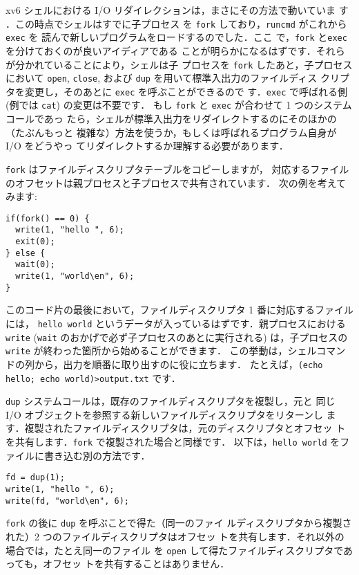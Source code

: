 xv6 シェルにおける I/O リダイレクションは，まさにその方法で動いていま
す ．この時点でシェルはすでに子プロセス
を \lstinline{fork} しており，\lstinline{runcmd} がこれから \lstinline{exec} を
読んで新しいプログラムをロードするのでした．ここ
で，\lstinline{fork} と\lstinline{exec} を分けておくのが良いアイディアである
ことが明らかになるはずです．それらが分かれていることにより，シェルは子
プロセスを \lstinline{fork} したあと，子プロセスにおいて \lstinline{open},
\lstinline{close}, および \lstinline{dup} を用いて標準入出力のファイルディス
クリプタを変更し，そのあとに \lstinline{exec} を呼ぶことができるので
す．\lstinline{exec} で呼ばれる側 (例では \lstinline{cat}) の変更は不要です．
もし \lstinline{fork} と \lstinline{exec} が合わせて 1 つのシステムコールであっ
たら，シェルが標準入出力をリダイレクトするのにそのほかの（たぶんもっと
複雑な）方法を使うか，もしくは呼ばれるプログラム自身が I/O をどうやっ
てリダイレクトするか理解する必要があります．


\lstinline{fork} はファイルディスクリプタテーブルをコピーしますが，
対応するファイルのオフセットは親プロセスと子プロセスで共有されています．
次の例を考えてみます:
\begin{lstlisting}[]
if(fork() == 0) {
  write(1, "hello ", 6);
  exit(0);
} else {
  wait(0);
  write(1, "world\en", 6);
}
\end{lstlisting}
このコード片の最後において，ファイルディスクリプタ 1 番に対応するファイルには，
\lstinline{hello world} というデータが入っているはずです．親プロセスにおける
\lstinline{write} (\lstinline{wait} のおかげで必ず子プロセスのあとに実行される)
は，子プロセスの \lstinline{write} が終わった箇所から始めることができます．
この挙動は，シェルコマンドの列から，出力を順番に取り出すのに役に立ちます．
たとえば，\lstinline{(echo hello; echo world)>output.txt} です．


\lstinline{dup} システムコールは，既存のファイルディスクリプタを複製し，元と
同じ I/O オブジェクトを参照する新しいファイルディスクリプタをリターンし
ます．複製されたファイルディスクリプタは，元のディスクリプタとオフセッ
トを共有します．\lstinline{fork} で複製された場合と同様です．
以下は，\lstinline{hello world} をファイルに書き込む別の方法です．
\begin{lstlisting}[]
fd = dup(1);
write(1, "hello ", 6);
write(fd, "world\en", 6);
\end{lstlisting}


\lstinline{fork} の後に \lstinline{dup} を呼ぶことで得た（同一のファイ
ルディスクリプタから複製された）2 つのファイルディスクリプタはオフセッ
トを共有します．それ以外の場合では，たとえ同一のファイル
を \lstinline{open} して得たファイルディスクリプタであっても，オフセッ
トを共有することはありません．

